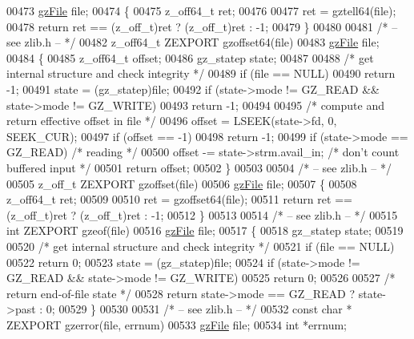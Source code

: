 \begin{DoxyCode}
{{{{00473     \hyperlink{structgz_file__s}{gzFile} file;
00474 \{
00475     z\_off64\_t ret;
00476 
00477     ret = gztell64(file);
00478     \textcolor{keywordflow}{return} ret == (z\_off\_t)ret ? (z\_off\_t)ret : -1;
00479 \}
00480 
00481 \textcolor{comment}{/* -- see zlib.h -- */}
00482 z\_off64\_t ZEXPORT gzoffset64(file)
00483     \hyperlink{structgz_file__s}{gzFile} file;
00484 \{
00485     z\_off64\_t offset;
00486     gz\_statep state;
00487 
00488     \textcolor{comment}{/* get internal structure and check integrity */}
00489     \textcolor{keywordflow}{if} (file == NULL)
00490         \textcolor{keywordflow}{return} -1;
00491     state = (gz\_statep)file;
00492     \textcolor{keywordflow}{if} (state->mode != GZ\_READ && state->mode != GZ\_WRITE)
00493         \textcolor{keywordflow}{return} -1;
00494 
00495     \textcolor{comment}{/* compute and return effective offset in file */}
00496     offset = LSEEK(state->fd, 0, SEEK\_CUR);
00497     \textcolor{keywordflow}{if} (offset == -1)
00498         \textcolor{keywordflow}{return} -1;
00499     \textcolor{keywordflow}{if} (state->mode == GZ\_READ)             \textcolor{comment}{/* reading */}
00500         offset -= state->strm.avail\_in;     \textcolor{comment}{/* don't count buffered input */}
00501     \textcolor{keywordflow}{return} offset;
00502 \}
00503 
00504 \textcolor{comment}{/* -- see zlib.h -- */}
00505 z\_off\_t ZEXPORT gzoffset(file)
00506     \hyperlink{structgz_file__s}{gzFile} file;
00507 \{
00508     z\_off64\_t ret;
00509 
00510     ret = gzoffset64(file);
00511     \textcolor{keywordflow}{return} ret == (z\_off\_t)ret ? (z\_off\_t)ret : -1;
00512 \}
00513 
00514 \textcolor{comment}{/* -- see zlib.h -- */}
00515 \textcolor{keywordtype}{int} ZEXPORT gzeof(file)
00516     \hyperlink{structgz_file__s}{gzFile} file;
00517 \{
00518     gz\_statep state;
00519 
00520     \textcolor{comment}{/* get internal structure and check integrity */}
00521     \textcolor{keywordflow}{if} (file == NULL)
00522         \textcolor{keywordflow}{return} 0;
00523     state = (gz\_statep)file;
00524     \textcolor{keywordflow}{if} (state->mode != GZ\_READ && state->mode != GZ\_WRITE)
00525         \textcolor{keywordflow}{return} 0;
00526 
00527     \textcolor{comment}{/* return end-of-file state */}
00528     \textcolor{keywordflow}{return} state->mode == GZ\_READ ? state->past : 0;
00529 \}
00530 
00531 \textcolor{comment}{/* -- see zlib.h -- */}
00532 \textcolor{keyword}{const} \textcolor{keywordtype}{char} * ZEXPORT gzerror(file, errnum)
00533     \hyperlink{structgz_file__s}{gzFile} file;
00534     \textcolor{keywordtype}{int} *errnum;
}}}}
\end{DoxyCode}
